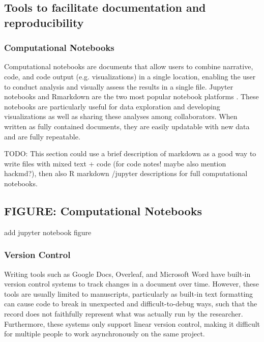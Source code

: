 \documentclass[10pt,letterpaper]{article}
\begin{document}

\subsection*{Tools to facilitate documentation and reproducibility}

\subsubsection*{Computational Notebooks} 

Computational notebooks are documents that allow users to combine narrative, code, and code output (e.g. visualizations) in a single location, enabling the user to conduct analysis and visually assess the results in a single file.
Jupyter notebooks and Rmarkdown are the two most popular notebook platforms \cite{kluyver2016jupyter, allaire2018rmarkdown}. 
These notebooks are particularly useful for data exploration and developing visualizations as well as sharing these analyses among collaborators. 
When written as fully contained documents, they are easily updatable with new data and are fully repeatable. 

TODO: This section could use a brief description of markdown as a good way to write files with mixed text + code (for code notes! maybe also mention hackmd?), then also R markdown /jupyter descriptions for full computational notebooks. 

 
\begin{greybox}{\subsection*{FIGURE: Computational Notebooks}
add jupyter notebook figure
}
\end{greybox}

\subsubsection*{Version Control} 

Writing tools such as Google Docs, Overleaf, and Microsoft Word have built-in version control systems to track changes in a document over time. 
However, these tools are usually limited to manuscripts, particularly as built-in text formatting can cause code to break in unexpected and difficult-to-debug ways, such that the record does not faithfully represent what was actually run by the researcher. 
Furthermore, these systems only support linear version control, making it difficult for multiple people to work asynchronously on the same project. 
\end{document}
